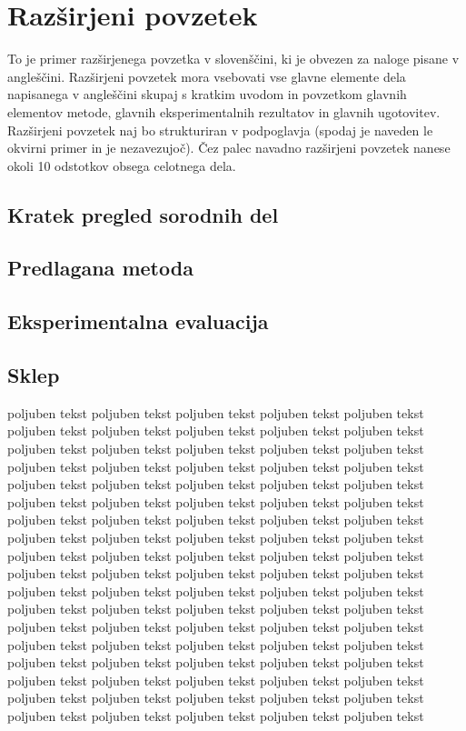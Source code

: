  \chapter{Razširjeni povzetek}
 
 To je primer razširjenega povzetka v slovenščini, ki je obvezen za naloge pisane v angleščini. Razširjeni povzetek mora vsebovati vse glavne elemente dela napisanega v angleščini skupaj s kratkim uvodom in povzetkom glavnih elementov metode, glavnih eksperimentalnih rezultatov in glavnih ugotovitev. Razširjeni povzetek naj bo strukturiran v podpoglavja (spodaj je naveden le okvirni primer in je nezavezujoč).
 Čez palec navadno razširjeni povzetek nanese okoli 10 odstotkov obsega celotnega dela. 
 
 \section{Kratek pregled sorodnih del}
 
 \section{Predlagana metoda}
 
 \section{Eksperimentalna evaluacija}
 
 \section{Sklep}
 
poljuben tekst  poljuben tekst  poljuben tekst  poljuben tekst  poljuben tekst  poljuben tekst  poljuben tekst  poljuben tekst  poljuben tekst  poljuben tekst  poljuben tekst  poljuben tekst  poljuben tekst  poljuben tekst  poljuben tekst  poljuben tekst  poljuben tekst  poljuben tekst  poljuben tekst  poljuben tekst  poljuben tekst  poljuben tekst  poljuben tekst  poljuben tekst  poljuben tekst  poljuben tekst  poljuben tekst  poljuben tekst  poljuben tekst  poljuben tekst  poljuben tekst  poljuben tekst  poljuben tekst  poljuben tekst  poljuben tekst  poljuben tekst  poljuben tekst  poljuben tekst  poljuben tekst  poljuben tekst  poljuben tekst  poljuben tekst  poljuben tekst  poljuben tekst  poljuben tekst  poljuben tekst  poljuben tekst  poljuben tekst  poljuben tekst  poljuben tekst  poljuben tekst  poljuben tekst  poljuben tekst  poljuben tekst  poljuben tekst  poljuben tekst  poljuben tekst  poljuben tekst  poljuben tekst  poljuben tekst  poljuben tekst  poljuben tekst  poljuben tekst  poljuben tekst  poljuben tekst  poljuben tekst  poljuben tekst  poljuben tekst  poljuben tekst  poljuben tekst  poljuben tekst  poljuben tekst  poljuben tekst  poljuben tekst  poljuben tekst  poljuben tekst  poljuben tekst  poljuben tekst  poljuben tekst  poljuben tekst  poljuben tekst  poljuben tekst  poljuben tekst  poljuben tekst  poljuben tekst  poljuben tekst  poljuben tekst  poljuben tekst  poljuben tekst  poljuben tekst 
